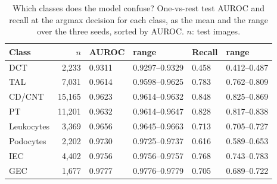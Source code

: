 \begin{table}[t]
\caption{Which classes does the model confuse? One-vs-rest test AUROC and recall at the argmax decision for each class, as the mean and the range over the three seeds, sorted by AUROC. $n$: test images.}
\label{tab:perclass}
\centering
\footnotesize
\setlength{\tabcolsep}{4pt}
\begin{tabular}{@{}lrllll@{}}
\toprule
Class & $n$ & AUROC & range & Recall & range \\
\midrule
DCT & 2,233 & 0.9311 & 0.9297--0.9329 & 0.458 & 0.412--0.487 \\
TAL & 7,031 & 0.9614 & 0.9598--0.9625 & 0.783 & 0.762--0.809 \\
CD/CNT & 15,165 & 0.9623 & 0.9614--0.9632 & 0.848 & 0.825--0.869 \\
PT & 11,201 & 0.9632 & 0.9614--0.9647 & 0.828 & 0.817--0.838 \\
Leukocytes & 3,369 & 0.9656 & 0.9645--0.9663 & 0.713 & 0.705--0.727 \\
Podocytes & 2,202 & 0.9730 & 0.9725--0.9737 & 0.616 & 0.589--0.653 \\
IEC & 4,402 & 0.9756 & 0.9756--0.9757 & 0.768 & 0.743--0.783 \\
GEC & 1,677 & 0.9777 & 0.9776--0.9779 & 0.705 & 0.689--0.722 \\
\bottomrule
\end{tabular}
\end{table}
